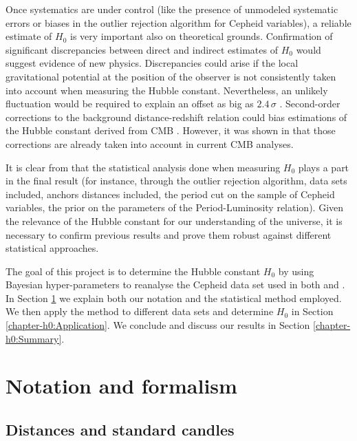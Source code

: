 Once systematics are under control (like the presence of unmodeled systematic errors or biases in the outlier rejection algorithm for Cepheid variables), a reliable estimate of $H_0$ is very important also on theoretical grounds. Confirmation of significant discrepancies between direct and indirect estimates of $H_0$ would suggest evidence of new physics. Discrepancies could arise if the local gravitational potential at the position of the observer is not consistently taken into account when measuring the Hubble constant. Nevertheless, an unlikely fluctuation would be required to explain an offset as big as $2.4\,\sigma$ \cite{Marra2013a}. Second-order corrections to the background distance-redshift relation could bias estimations of the Hubble constant derived from CMB \cite{Clarkson:2014pda}. However, it was shown in \cite{Bonvin:2015uha} that those corrections are already taken into account in current CMB analyses.           

It is clear from \cite{Efstathiou:2013via} that the statistical analysis done when measuring $H_0$ plays a part in the final result (for instance, through the outlier rejection algorithm, data sets included, anchors distances included, the period cut on the sample of Cepheid variables, the prior on the parameters of the Period-Luminosity relation). Given the relevance of the Hubble constant for our understanding of the universe, it is necessary to confirm previous results and prove them robust against different statistical approaches.

The goal of this project is to determine the Hubble constant $H_0$ by using Bayesian hyper-parameters to reanalyse the Cepheid data set used in both \cite{Riess:2011yx} and \cite{Riess:2016jrr}. In Section \ref{chapter-h0:notation-and-method} we explain both our notation and the statistical method employed. We then apply the method to different data sets and determine $H_0$ in Section \ref{chapter-h0:Application}. We conclude and discuss our results in Section \ref{chapter-h0:Summary}. 

\section{Notation and formalism}
\label{chapter-h0:notation-and-method}

\subsection{Distances and standard candles}

